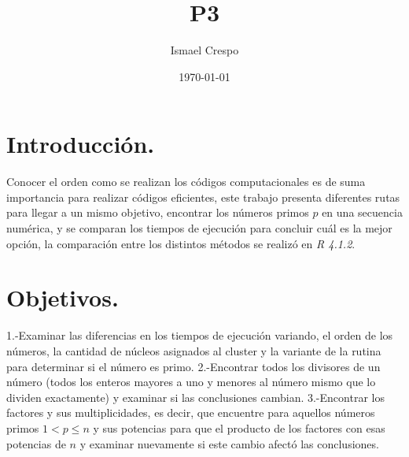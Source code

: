 \documentclass{article}
\title{P3}
\author{Ismael Crespo}
\date{\today}
\begin{document}
\maketitle

\section{Introducción.}
Conocer el orden como se realizan los códigos computacionales es de suma importancia para realizar códigos eficientes, este trabajo presenta diferentes rutas para llegar a un mismo objetivo, encontrar los números primos $p$ en una secuencia numérica, y se comparan los tiempos de ejecución para concluir cuál es la mejor opción, la comparación entre los distintos métodos se realizó en  \emph{R 4.1.2}.
\section{Objetivos.}
1.-Examinar las diferencias en los tiempos de ejecución variando, el orden de los números, la cantidad de núcleos asignados al cluster y la variante de la rutina para determinar si el número es primo.
2.-Encontrar todos los divisores de un número (todos los enteros mayores a uno y menores al número mismo que lo dividen exactamente) y examinar si las conclusiones cambian.
3.-Encontrar los factores y sus multiplicidades, es decir, que encuentre para  aquellos números primos $1<p\leq n  $ y sus potencias para que el producto de los factores con esas potencias de $n$ y examinar nuevamente si este cambio afectó las conclusiones.
\end{document}
